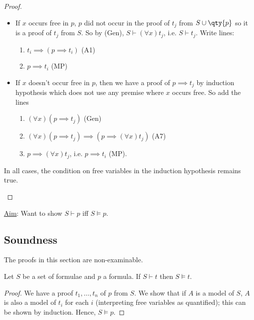 \begin{proof}
\begin{itemize}
\begin{itemize}
            \item If $x$ occurs free in $p$, $p$ did not occur in the proof of $t_j$ from $S \cup \qty{p}$ so it is a proof of $t_j$ from $S$.
            So by (Gen), $S \vdash (\forall x) t_j$, i.e. $S \vdash t_j$.
            Write lines:
            \begin{enumerate}
                \item $t_i \implies (p \implies t_i)$ (A1)
                \item $p \implies t_i$ (MP)
            \end{enumerate}
            \item If $x$ doesn't occur free in $p$, then we have a proof of $p \implies t_j$ by induction hypothesis which does not use any premise where $x$ occurs free.
            So add the lines
            \begin{enumerate}
                \item $(\forall x) (p \implies t_j)$ (Gen)
                \item $(\forall x) (p \implies t_j) \implies (p \implies (\forall x) t_j)$ (A7)
                \item $p \implies (\forall x) t_j$, i.e. $p \implies t_i$ (MP).
            \end{enumerate}
        \end{itemize}

        In all cases, the condition on free variables in the induction hypothesis remains true.
    \end{itemize}
\end{proof}

\underline{Aim}: Want to show $S \vdash p$ iff $S \models p$.

\subsection{Soundness}
The proofs in this section are non-examinable.

\begin{proposition}
    Let $S$ be a set of formulae and $p$ a formula.
    If $S \vdash t$ then $S \models t$.
\end{proposition}

\begin{proof}
    We have a proof $t_1, \dots, t_n$ of $p$ from $S$.
    We show that if $A$ is a model of $S$, $A$ is also a model of $t_i$ for each $i$ (interpreting free variables as quantified); this can be shown by induction.
    Hence, $S \models p$.
\end{proof}

